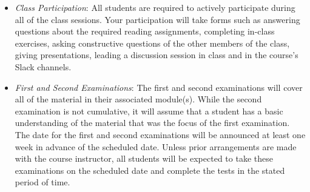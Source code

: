 \documentclass[11pt]{article} %
\begin{document}
\begin{itemize}

  \item {\em Class Participation}: All students are required to actively participate during all of the class sessions. Your participation will take forms such as answering questions about the required reading assignments, completing in-class exercises, asking constructive questions of the other members of the class, giving presentations, leading a discussion session in class and in the course's Slack channels. 


	
  \item {\em First and Second Examinations}: The first and second examinations will cover all of the material in their associated module(s). While the second examination is not cumulative, it will assume that a student has a basic understanding of the material that was the focus of the first examination. The date for the first and second examinations will be announced at least one week in advance of the scheduled date. Unless prior arrangements are made with the course instructor, all students will be expected to take these examinations on the scheduled date and complete the tests in the stated period of time.




\end{itemize}
\end{document}
